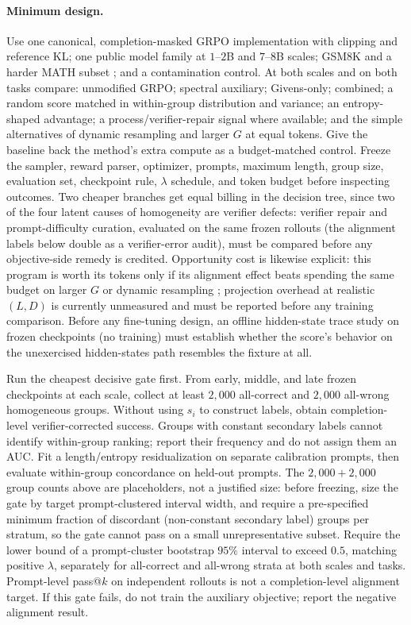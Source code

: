 \documentclass{article}
\begin{document}
\paragraph{Minimum design.}
Use one canonical, completion-masked GRPO implementation with clipping and
reference KL; one public model family at $1$--$2$B and $7$--$8$B scales; GSM8K
and a harder MATH subset \citep{cobbe2021gsm8k,hendrycks2021math}; and a contamination control.  At both scales and on
both tasks compare: unmodified GRPO; spectral auxiliary; Givens-only; combined;
a random score matched in within-group distribution and variance; an
entropy-shaped advantage; a process/verifier-repair signal where available;
and the simple alternatives of dynamic resampling and larger $G$ at equal
tokens.  Give the baseline back the method's extra compute as a budget-matched
control.  Freeze the sampler, reward parser, optimizer, prompts, maximum
length, group size, evaluation set, checkpoint rule, $\lambda$ schedule, and
token budget before inspecting outcomes. Two cheaper branches get equal
billing in the decision tree, since two of the four latent causes of
homogeneity are verifier defects: verifier repair and prompt-difficulty
curation, evaluated on the same frozen rollouts (the alignment labels
below double as a verifier-error audit), must be compared before any
objective-side remedy is credited. Opportunity cost is likewise explicit:
this program is worth its tokens only if its alignment effect beats
spending the same budget on larger $G$ or dynamic resampling
\citep{yu2025dapo}; projection overhead at realistic $(L,D)$ is
currently unmeasured and must be reported before any training comparison.
Before any fine-tuning design, an offline hidden-state trace study on
frozen checkpoints (no training) must establish whether the score's
behavior on the unexercised hidden-states path resembles the fixture at
all.

Run the cheapest decisive gate first.  From early, middle, and late frozen
checkpoints at each scale, collect at least $2{,}000$ all-correct and $2{,}000$
all-wrong homogeneous groups.  Without using $s_i$ to construct labels, obtain
completion-level verifier-corrected success. Groups with constant secondary
labels cannot identify within-group ranking; report their frequency and do
not assign them an AUC. Fit a length/entropy residualization on separate
calibration prompts, then evaluate within-group concordance on held-out
prompts. The $2{,}000+2{,}000$ group counts above are placeholders, not
a justified size: before freezing, size the gate by target
prompt-clustered interval width, and require a pre-specified minimum
fraction of discordant (non-constant secondary label) groups per stratum,
so the gate cannot pass on a small unrepresentative subset. Require the lower bound of a prompt-cluster bootstrap $95\%$
interval to exceed $0.5$, matching positive $\lambda$, separately for
all-correct and all-wrong strata at both scales and tasks. Prompt-level
pass@$k$ on independent rollouts is not a completion-level alignment target.
If this gate fails, do not train the auxiliary objective; report
the negative alignment result.
\end{document}
